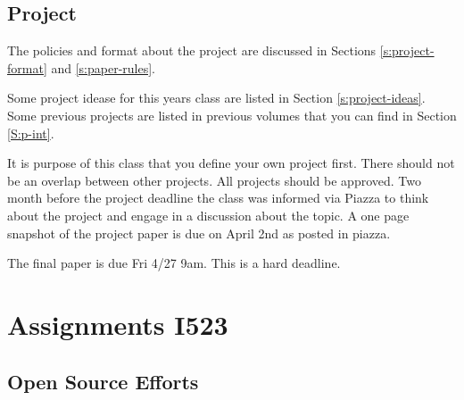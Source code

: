 \subsection{Project}
\label{E:project}

\begin{exercise} 

The policies and format about the project are discussed in Sections
\ref{s:project-format} and
\ref{s:paper-rules}.

Some project idease for this years class are listed in Section
\ref{s:project-ideas}. Some previous projects are listed in previous
volumes that you can find in Section \ref{S:p-int}.

It is purpose of this class that you define your own project
first. There should not be an overlap between other projects. All
projects should be approved.  Two month before the project deadline
the class was informed via Piazza to think about the project and
engage in a discussion about the topic. A one page snapshot of the
project paper is due on April 2nd as posted in piazza.

The final paper is due Fri 4/27 9am. This is a hard deadline.

\end{exercise} 


\section{Assignments I523}
\label{s:i523-assignment}

\subsection{Open Source Efforts}

